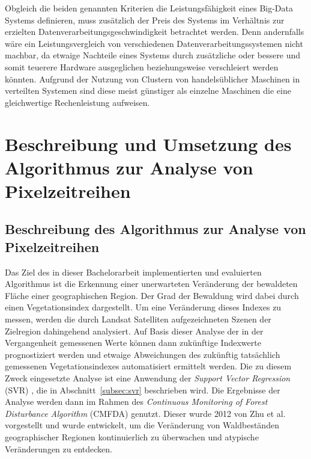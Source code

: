 Obgleich die beiden genannten Kriterien die Leistungsfähigkeit eines Big-Data Systems definieren, muss zusätzlich der Preis des Systems im Verhältnis zur erzielten Datenverarbeitungsgeschwindigkeit betrachtet werden. Denn andernfalls wäre ein Leistungsvergleich von verschiedenen Datenverarbeitungssystemen nicht machbar, da etwaige Nachteile eines Systems durch zusätzliche oder bessere und somit teuerere Hardware ausgeglichen beziehungsweise verschleiert werden könnten. Aufgrund der Nutzung von Clustern von handelsüblicher Maschinen in verteilten Systemen sind diese meist günstiger als einzelne Maschinen die eine gleichwertige Rechenleistung aufweisen.


\chapter[Algorithmus zur Analyse von Pixelzeitreihen]{Beschreibung und Umsetzung des Algorithmus zur Analyse von Pixelzeitreihen}
\label{cha:AlgorithmForSatellitePictureAnalysis}
\section[Beschreibung des Algorithmus]{Beschreibung des Algorithmus zur Analyse von Pixelzeitreihen}
\label{sec:DescriptionOfTheAlgorithm}
Das Ziel des in dieser Bachelorarbeit implementierten und evaluierten Algorithmus ist die Erkennung einer unerwarteten Veränderung der bewaldeten Fläche einer geographischen Region. Der Grad der Bewaldung wird dabei durch einen Vegetationsindex dargestellt. Um eine Veränderung dieses Indexes zu messen, werden die durch Landsat Satelliten aufgezeichneten Szenen der Zielregion dahingehend analysiert. Auf Basis dieser Analyse der in der Vergangenheit gemessenen Werte können dann zukünftige Indexwerte prognostiziert werden und etwaige Abweichungen des zukünftig tatsächlich gemessenen Vegetationsindexes automatisiert ermittelt werden. Die zu diesem Zweck eingesetzte Analyse ist eine Anwendung der \textit{Support Vector Regression} (SVR) \cite{Basak2007}, die in Abschnitt~\ref{subsec:svr} beschrieben wird. Die Ergebnisse der Analyse werden dann im Rahmen des \textit{Continuous Monitoring of Forest Disturbance Algorithm} (CMFDA) \cite{Zhu2012} genutzt. Dieser wurde 2012 von Zhu et al. vorgestellt \cite{Zhu2012} und wurde entwickelt, um die Veränderung von Waldbeständen geographischer Regionen kontinuierlich zu überwachen und atypische Veränderungen zu entdecken. 

